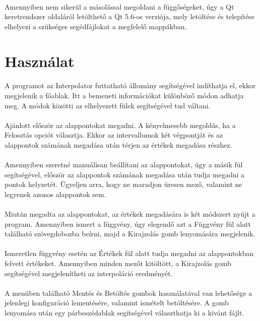 \documentclass[12pt]{report}
\begin{document}
\paragraph{}
Amennyiben nem sikerül a másolással megoldani a függőségeket, úgy a Qt keretrendszer oldaláról letölthető a Qt 5.6-os verziója, mely letöltése és telepítése elhelyezi a szükséges segédfájlokat a megfelelő mappákban.
\section{Használat}
\paragraph{}
A programot az Interpolator futtatható állomány segítségével indíthatja el, ekkor megjelenik a főablak.
Itt a bemeneti információkat különböző módon adhatja meg. A módok közötti az elhelyezett fülek segítségével tud váltani.
\paragraph{}
Ajánlott először az alappontokat megadni. A kényelmesebb megoldás, ha a Felosztás opciót választja. Ekkor az intervallumok két végpontját és az alappontok számának megadása után térjen az értékek megadása részhez.
\paragraph{}
Amennyiben szeretné manuálisan beállítani az alappontokat, úgy a másik fül segítségével, először az alappontok számának megadása után tudja megadni a pontok helyzetét. Ügyeljen arra, hogy ne maradjon üresen mező, valamint ne legyenek azonos alappontok sem.
\paragraph{}
Miután megadta az alappontokat, az értékek megadására is két módszert nyújt a program. Amennyiben ismert a függvény, úgy elegendő azt a Függvény fül alatt található szövegdobozba beírni, majd a Kirajzolás gomb lenyomására megjelenik.
\paragraph{}
Ismeretlen függvény esetén az Értékek fül alatt tudja megadni az alappontokban felvett értékeket. Amennyiben minden mezőt kitöltött, a Kirajzolás gomb segítségével megjelenítheti az interpoláció eredményét.
\paragraph{}
A menüben található Mentés és Betöltés gombok használatával van lehetősége a jelenlegi konfiguráció lementésére, valamint ismételt betöltésére. A gomb lenyomása után egy párbeszédablak segítségével választhatja ki a kívánt fájlt.
\end{document}
